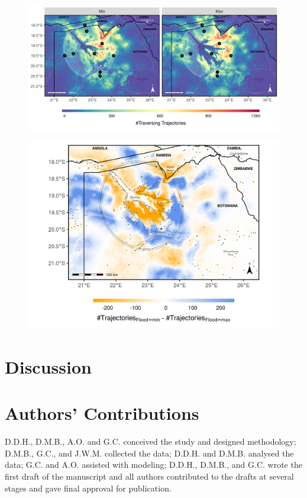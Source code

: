 \documentclass[abstract=on,10pt,a4paper,bibliography=totocnumbered]{article}
\begin{document}
\begin{figure}
  \begin{center}
  \includegraphics[width = \textwidth]{99_Heatmaps.png}
  \caption{}
  \label{Heatmaps}
  \end{center}
\end{figure}

\begin{figure}
  \begin{center}
  \includegraphics[width = \textwidth]{99_DifferenceMap.png}
  \caption{}
  \label{DifferenceHeatmaps}
  \end{center}
\end{figure}

\section{Discussion}


\section{Authors' Contributions}
D.D.H., D.M.B., A.O. and G.C. conceived the study and designed methodology;
D.M.B., G.C., and J.W.M. collected the data; D.D.H. and D.M.B. analysed the
data; G.C. and A.O. assisted with modeling; D.D.H., D.M.B., and G.C. wrote the
first draft of the manuscript and all authors contributed to the drafts at
several stages and gave final approval for publication.
\end{document}

